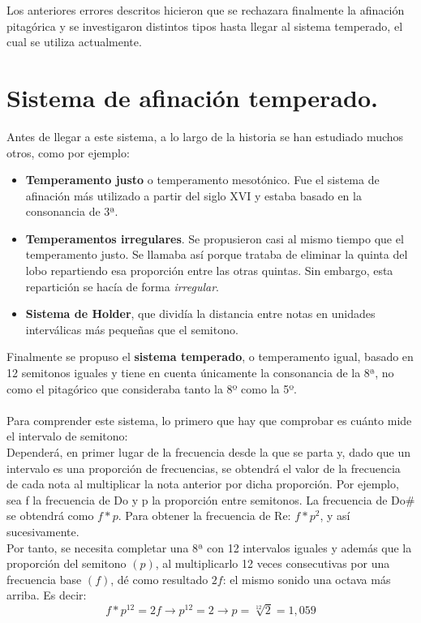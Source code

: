 \documentclass[a4paper, openright, 11pt, titlepage]{report}
\theoremstyle{definition}\newtheorem{defin}[propo]{Definition}
\theoremstyle{definition}\newtheorem{obser}[propo]{Remark}
\theoremstyle{definition}\newtheorem{ejem}[propo]{Ejemplo}
\theoremstyle{definition}\newtheorem{algoritmo}[propo]{Algoritmo}
\begin{document}
Los anteriores errores descritos hicieron que se rechazara finalmente la afinación pitagórica y se investigaron distintos tipos hasta llegar al sistema temperado, el cual se utiliza actualmente.

\section{Sistema de afinación temperado.}
Antes de llegar a este sistema, a lo largo de la historia se han estudiado muchos otros, como por ejemplo: 
\begin{itemize}
    \item \textbf{Temperamento justo} o temperamento mesotónico. Fue el sistema de afinación más utilizado a partir del siglo XVI y estaba basado en la consonancia de 3ª. 
    \item \textbf{Temperamentos irregulares}. Se propusieron casi al mismo tiempo que el temperamento justo. Se llamaba así porque trataba de eliminar la quinta del lobo repartiendo esa proporción entre las otras quintas. Sin embargo, esta repartición se hacía de forma \textit{irregular}.
    \item \textbf{Sistema de Holder}, que dividía la distancia entre notas en unidades interválicas más pequeñas que el semitono.
\end{itemize}
Finalmente se propuso el \textbf{sistema temperado}, o temperamento igual, basado en 12 semitonos iguales y tiene en cuenta únicamente la consonancia de la 8ª, no como el pitagórico que consideraba tanto la 8º como la 5º.\\\\
Para comprender este sistema, lo primero que hay que comprobar es cuánto mide el intervalo de semitono:\\
Dependerá, en primer lugar de la frecuencia desde la que se parta y, dado que un intervalo es una proporción de frecuencias, se obtendrá el valor de la frecuencia de cada nota al multiplicar la nota anterior por dicha proporción. Por ejemplo, sea f la frecuencia de Do y p la proporción entre semitonos. La frecuencia de Do# se obtendrá como $f*p$. Para obtener la frecuencia de Re: $f*p^{2}$, y así sucesivamente.\\
Por tanto, se necesita completar una 8ª con 12 intervalos iguales y además que la proporción del semitono $(p)$, al multiplicarlo 12 veces consecutivas por una frecuencia base $(f)$, dé como resultado $2f$: el mismo sonido una octava más arriba. Es decir: $$f*p^{12} = 2f \longrightarrow p^{12} = 2 \longrightarrow p = \sqrt[12]{2} = 1,059$$
\end{document}
